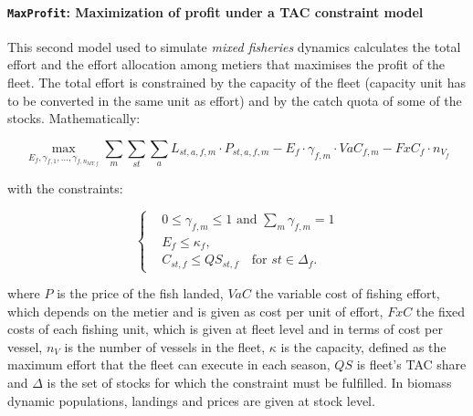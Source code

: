 \paragraph{\texttt{MaxProfit}: Maximization of profit under a TAC constraint model} \hspace{0pt} \smallskip

This second model used to simulate \textit{mixed fisheries} dynamics calculates the total effort and the effort 
  allocation among metiers that maximises the profit of the fleet.
  The total effort is constrained by the capacity of the fleet (capacity unit has to be converted in the same unit as effort) 
  and by the catch quota of some  of the stocks. Mathematically:
                                               
    \begin{equation}\label{eq:maxprof.stkCnst}
                   \max_{E_f, \gamma_{f,1},\ldots,\gamma_{f,n_{MT,f}}} 
                    \sum_m\sum_{st}\sum_a  L_{st,a,f,m} \cdot P_{st,a,f,m}- 
                           E_f\cdot\gamma_{f,m}\cdot VaC_{f,m} - FxC_f\cdot n_{V_f}                                                   
    \end{equation}

  \noindent with the constraints:

  \begin{equation}\label{eq:MP_consts}
                  \left\{
                  \begin{array}{ll}
                                 & 0 \leq \gamma_{f,m}\leq 1 \text{ and } \sum_m\gamma_{f,m} = 1\\
                                 & E_f \leq \kappa_f,\\
                                 & C_{st,f} \leq QS_{st,f} \quad \text{for } st \in \Delta_f.
                  \end{array}        
                  \right.
  \end{equation}

\noindent where $P$ is the price of the fish landed, 
  $VaC$ the variable cost of fishing effort, which depends on the metier and is given as cost per unit of effort, 
  $FxC$ the fixed costs of each fishing unit, which is given at fleet level and in terms of cost per vessel,
  $n_{V}$ is the number of vessels in the fleet,
  $\kappa$ is the capacity, defined as the maximum effort that the fleet can execute in each season,
  $QS$ is fleet's TAC share and
  $\Delta$ is the set of stocks for which the constraint must be fulfilled. 
In biomass dynamic populations, landings and prices are given at stock level.

